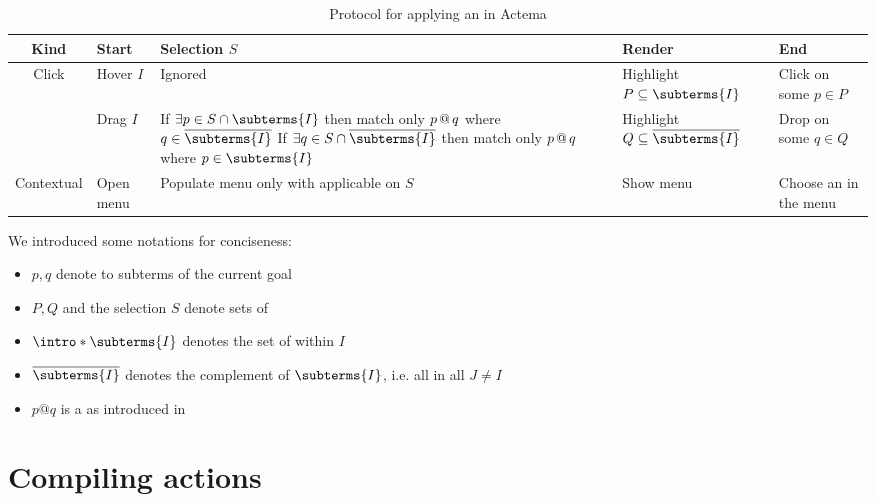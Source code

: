 \begin{table*}[]
  \def\arraystretch{1.5}
  \begin{tabular}{|c|C{0.2\textwidth}|C{0.4\textwidth}|C{0.25\textwidth}|C{0.2\textwidth}|}
  \hline
  \textbf{Kind} & \textbf{Start}       & \textbf{Selection $S$} &
  \textbf{Render}                      & \textbf{End} \\ \hline
  Click         & Hover  $I$       & Ignored & Highlight $P \subseteq
  \subterms{I}$ & Click on some $p \in P$    \\ \hline
             & Drag  $I$        &
      If $\exists p \in S \cap \subterms{I}$ then match only $p \operatorname{\mathrel{@}} q$ where
      $q \in \substermscompl{\subterms{I}}$
      \newline
      If $\exists q \in S \cap \substermscompl{\subterms{I}}$ then match only $p
      \operatorname{\mathrel{@}} q$ where $p \in \subterms{I}$
    & Highlight $Q \subseteq \substermscompl{\subterms{I}}$ & Drop on some $q \in Q$ \\ \hline
  Contextual    & Open menu & Populate menu only with 
  applicable on $S$ & Show menu & Choose an  in the menu \\ \hline
  \end{tabular}
  \raggedright
  \parbox{\textwidth}{
    \vspace{1.5em}
    We introduced some notations for conciseness:
    \begin{itemize}
      \item $p, q$ denote  to subterms of the current goal
      \item $P, Q$ and the selection $S$ denote sets of 
      \item $\intro*\subterms{I}$ denotes the set of  within  $I$
      \item $\substermscompl{\subterms{I}}$ denotes the complement of $\subterms{I}$, i.e.
      all  in all  $J \not= I$
      \item $p @ q$ is a  as introduced in 
    \end{itemize}}

  \caption{Protocol for applying an  in Actema}
\end{table*}


\section{Compiling actions}

